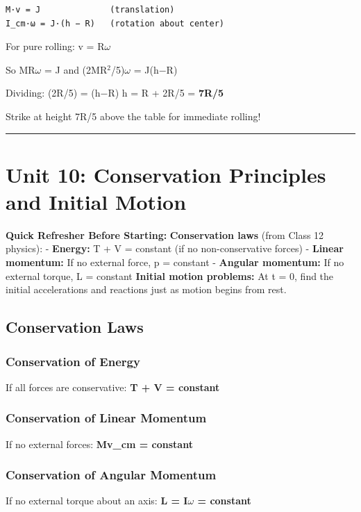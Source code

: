 \documentclass[12pt,a4paper,openany]{book}
\begin{document}
{{\begin{verbatim}
M·v = J              (translation)
I_cm·ω = J·(h − R)   (rotation about center)
\end{verbatim}

For pure rolling: v = R$\omega$

So MR$\omega$ = J and (2MR$^2$/5)$\omega$ = J(h−R)

Dividing: (2R/5) = (h−R)  h = R + 2R/5 = \textbf{7R/5}

Strike at height 7R/5 above the table for immediate rolling!

\bigskip\noindent\rule{\textwidth}{0.4pt}\bigskip

\section{Unit 10: Conservation Principles and Initial Motion}

\begin{prereqbox}
 \textbf{Quick Refresher Before Starting:}
\textbf{Conservation laws} (from Class 12 physics):
- \textbf{Energy:} T + V = constant (if no non-conservative forces)
- \textbf{Linear momentum:} If no external force, p = constant
- \textbf{Angular momentum:} If no external torque, L = constant
\textbf{Initial motion problems:} At t = 0, find the initial accelerations and reactions just as motion begins from rest.
\end{prereqbox}


\subsection{Conservation Laws }

\subsubsection{Conservation of Energy}
If all forces are conservative: \textbf{T + V = constant}

\subsubsection{Conservation of Linear Momentum}
If no external forces: \textbf{Mv_cm = constant}

\subsubsection{Conservation of Angular Momentum}
If no external torque about an axis: \textbf{L = I$\omega$ = constant}

}}
\end{document}
